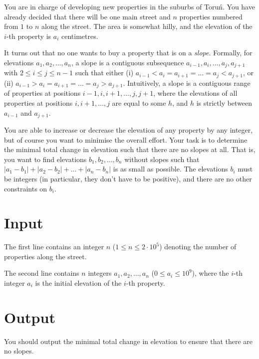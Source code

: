 You are in charge of developing new properties in the suburbs of Toruń.
You have already decided that there will be one main street and $n$ properties
numbered from $1$ to $n$ along the street. The area is somewhat hilly,
and the elevation of the $i$-th property is $a_{i}$ centimetres.

It turns out that no one wants to
buy a property that is on a \emph{slope}.
Formally, for elevations $a_1, a_2, \dots, a_n$, a slope is
a contiguous subsequence $a_{i-1}, a_i, \dots, a_j, a_{j+1}$ with $2 \leq i\leq j\leq n-1$ such that
either (i) $a_{i-1} < a_{i}=a_{i+1}=\ldots=a_{j}  < a_{j+1}$, or (ii) $a_{i-1} > a_{i}=a_{i+1}=\ldots=a_{j} > a_{j+1}$.
Intuitively, a slope is a contiguous range of properties at positions $i-1, i, i+1, \ldots, j, j+1$,
where the elevations of all properties at positions $i,i+1,\ldots,j$ are equal to some $h$, and $h$ is strictly between
$a_{i-1}$ and $a_{j+1}$. 

You are able to increase or decrease the
elevation of any property by any integer, but of course you want to minimise the overall effort.
Your task is to determine the minimal total change in elevation such that there are no slopes at all.
That is, you want to find elevations $b_1, b_2, \dots, b_n$ without slopes
such that $|a_1 - b_1| + |a_2 - b_2| + \dots + |a_n - b_n|$ is as small as possible.
The elevations $b_i$ must be integers (in particular, they don't have to be positive),
and there are no other constraints on $b_i$.
 
\section*{Input}
The first line contains an integer $n$ ($1\leq n\leq 2 \cdot 10^{5}$) denoting the number of properties
along the street.

The second line contains $n$ integers $a_{1}, a_{2}, \ldots, a_{n}$ ($0\leq a_{i} \leq 10^{9}$),
where the $i$-th integer $a_{i}$ is the initial elevation of the $i$-th property.

\section*{Output}
You should output the minimal total change in elevation to ensure that there are no slopes.

